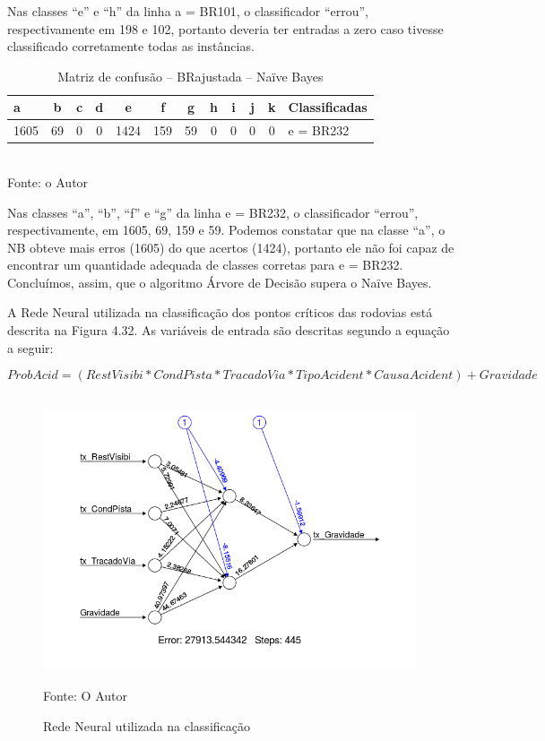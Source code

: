 Nas classes ``e'' e ``h'' da linha a = BR101, o classificador ``errou'', respectivamente em 198 e 102, portanto deveria ter entradas a zero caso tivesse classificado corretamente todas as instâncias.

	\begin{table}[!ht]
		\centering
		\caption{Matriz de confusão -- BRajustada -- Naïve Bayes}
		\vspace{1mm}
		\begin{tabular}{l|c|c|c|c|c|c|c|c|c|c|l}
			\hline
			\textbf{a} & \textbf{b} & \textbf{c} & \textbf{d} & \textbf{e} & \textbf{f} & \textbf{g} & \textbf{h} & 
			\textbf{i} & \textbf{j} & \textbf{k} & 		\textbf{Classificadas}\\
			\hline
			 1605 &  69 &  0 &  0 & 1424 & 159 &   59  &  0   &  0  &  0 & 0 &  e = BR232			
		\end{tabular}
		\\
		\tiny Fonte: o Autor
	\end{table}

Nas classes ``a'', ``b'', ``f'' e ``g'' da linha e = BR232, o classificador ``errou'', respectivamente, em 1605, 69, 159 e 59. Podemos constatar que na classe ``a'', o NB obteve mais erros (1605) do que acertos (1424), portanto ele não foi capaz de encontrar um quantidade adequada de classes corretas para e = BR232. Concluímos, assim, que o algoritmo Árvore de Decisão supera o Naïve Bayes.

\pagebreak

A Rede Neural utilizada na classificação dos pontos críticos das rodovias está descrita na Figura 4.32. As variáveis de entrada são descritas segundo a equação a seguir: 

\begin{equation}
ProbAcid = (RestVisibi * CondPista * TracadoVia * TipoAcident * CausaAcident) + Gravidade
\end{equation}
 
 

\begin{figure}[!ht]
	\centering
	\caption{Rede Neural utilizada na classificação}
	\includegraphics[width=110mm, height=85mm]{Figuras/Resultados/rnn101.png}\\
	\tiny Fonte: O Autor
	\label{fig:RNN2}
\end{figure}

